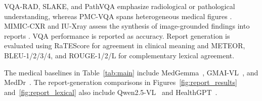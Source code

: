 VQA-RAD, SLAKE, and PathVQA emphasize radiological or pathological understanding, whereas PMC-VQA spans heterogeneous medical figures \citep{lau2018dataset,liu2021slake,he2020pathvqa,zhang2024pmc}. MIMIC-CXR and IU-Xray assess the synthesis of image-grounded findings into reports \citep{johnson2019mimic,demnerfushman2016preparing}. VQA performance is reported as accuracy. Report generation is evaluated using RaTEScore for agreement in clinical meaning and METEOR, BLEU-1/2/3/4, and ROUGE-1/2/L for complementary lexical agreement.

The medical baselines in Table~\ref{tab:main} include MedGemma~\citep{sellergren2025medgemma}, GMAI-VL~\citep{li2026gmai}, and MedDr~\citep{he2024meddr}. The report-generation comparisons in Figures~\ref{fig:report_results} and~\ref{fig:report_lexical} also include Qwen2.5-VL~\citep{bai2025qwen25} and HealthGPT~\citep{lin2025healthgpt}.
